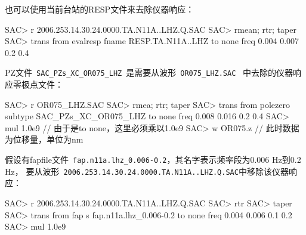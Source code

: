 也可以使用当前台站的RESP文件来去除仪器响应：
\begin{SACCode}
SAC> r 2006.253.14.30.24.0000.TA.N11A..LHZ.Q.SAC
SAC> rmean; rtr; taper
SAC> trans from evalresp fname RESP.TA.N11A..LHZ to none freq 0.004 0.007 0.2 0.4
\end{SACCode}

PZ文件~\verb+SAC_PZs_XC_OR075_LHZ+~是需要从波形~\verb+OR075_LHZ.SAC+~
中去除的仪器响应零极点文件：
\begin{SACCode}
SAC> r OR075_LHZ.SAC
SAC> rmea; rtr; taper
SAC> trans from polezero subtype SAC_PZs_XC_OR075_LHZ to none freq 0.008 0.016 0.2 0.4
SAC> mul 1.0e9          // 由于是to none，这里必须乘以1.0e9
SAC> w OR075.z          // 此时数据为位移量，单位为nm
\end{SACCode}

假设有fapfile文件~\verb+fap.n11a.lhz_0.006-0.2+，其名字表示频率段为0.006 Hz到0.2 Hz，
要从波形~\verb+2006.253.14.30.24.0000.TA.N11A..LHZ.Q.SAC+中移除该仪器响应：
\begin{SACCode}
SAC> r 2006.253.14.30.24.0000.TA.N11A..LHZ.Q.SAC
SAC> rtr
SAC> taper
SAC> trans from fap s fap.n11a.lhz_0.006-0.2 to none freq 0.004 0.006 0.1 0.2
SAC> mul 1.0e9
\end{SACCode}
